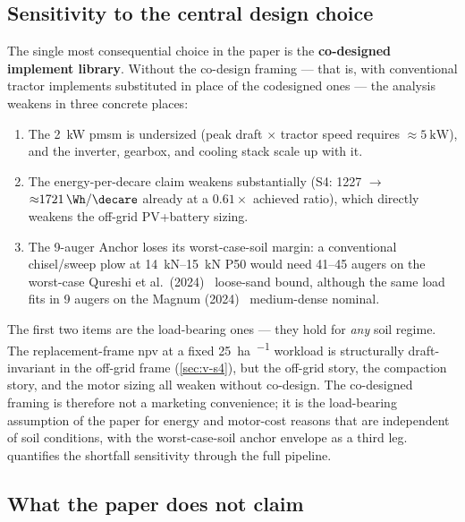 \documentclass[11pt,a4paper]{article}
\begin{document}
\subsection{Sensitivity to the central design choice}\label{sec:codesign-sensitivity}

The single most consequential choice in the paper is the \textbf{co-designed implement library}. Without the co-design framing --- that is, with conventional tractor implements substituted in place of the codesigned ones --- the analysis weakens in three concrete places:

\begin{enumerate}[leftmargin=1.6em,itemsep=0.1em]
    \item The \SI{2}{\kilo\watt} \gls{pmsm} is undersized (peak draft $\times$ tractor speed requires ${\approx}\SI{5}{\kilo\watt}$), and the inverter, gearbox, and cooling stack scale up with it.
    \item The energy-per-decare claim weakens substantially (S4: \SI{1227}{} $\to$ ${\approx}\SI{1721}{\Wh\per\decare}$ already at a $0.61\times$ achieved ratio), which directly weakens the off-grid PV+battery sizing.
    \item The 9-auger Anchor loses its worst-case-soil margin: a conventional chisel/sweep plow at \SIrange{14}{15}{\kilo\newton} P50 would need 41--45 augers on the worst-case Qureshi et al.\ (2024)~\cite{khand2024helical} loose-sand bound, although the same load fits in 9 augers on the Magnum (2024)~\cite{magnum2024fixed} medium-dense nominal.
\end{enumerate}

The first two items are the load-bearing ones --- they hold for \emph{any} soil regime. The replacement-frame \gls{npv} at a fixed \SI{25}{\hectare\per\year} workload is structurally draft-invariant in the off-grid frame (\cref{sec:v-s4}), but the off-grid story, the compaction story, and the motor sizing all weaken without co-design. The co-designed framing is therefore not a marketing convenience; it is the load-bearing assumption of the paper for energy and motor-cost reasons that are independent of soil conditions, with the worst-case-soil anchor envelope as a third leg.  quantifies the shortfall sensitivity through the full pipeline.

\subsection{What the paper does not claim}\label{sec:not-claim}
\end{document}
